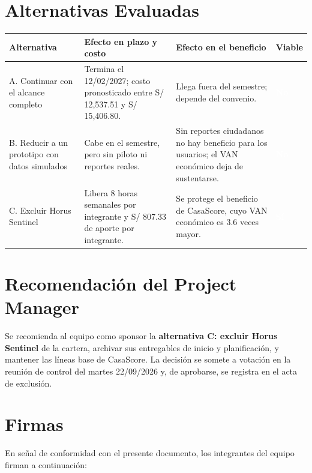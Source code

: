 \documentclass[11pt,a4paper]{article}
\newcommand{\etiqueta}[2]{{\setlength{\fboxsep}{2pt}\colorbox{#1}{\textcolor{white}{\scriptsize\bfseries #2}}}}
\begin{document}
\section{Alternativas Evaluadas}
{\small
{}
\noindent\begin{tabularx}{\textwidth}{@{}P{2.8cm} L L C{1.7cm}@{}}
\toprule
{}
\textbf{Alternativa} & \textbf{Efecto en plazo y costo} & \textbf{Efecto en el beneficio} & \textbf{Viable} \\
\midrule
A. Continuar con el alcance completo & Termina el 12/02/2027; costo pronosticado entre S/ 12,537.51 y S/ 15,406.80. & Llega fuera del semestre; depende del convenio. & \etiqueta{SevAlta}{No} \\
B. Reducir a un prototipo con datos simulados & Cabe en el semestre, pero sin piloto ni reportes reales. & Sin reportes ciudadanos no hay beneficio para los usuarios; el VAN económico deja de sustentarse. & \etiqueta{SevAlta}{No} \\
C. Excluir Horus Sentinel & Libera 8 horas semanales por integrante y S/ 807.33 de aporte por integrante. & Se protege el beneficio de CasaScore, cuyo VAN económico es 3.6 veces mayor. & \etiqueta{Rama4}{Sí} \\
\bottomrule
\end{tabularx}
}

\section{Recomendación del Project Manager}
Se recomienda al equipo como sponsor la \textbf{alternativa C: excluir Horus Sentinel} de la cartera, archivar sus entregables de inicio y planificación, y mantener las líneas base de CasaScore. La decisión se somete a votación en la reunión de control del martes 22/09/2026 y, de aprobarse, se registra en el acta de exclusión.

\section{Firmas}
\noindent En señal de conformidad con el presente documento, los integrantes del equipo firman a continuación:
\end{document}

